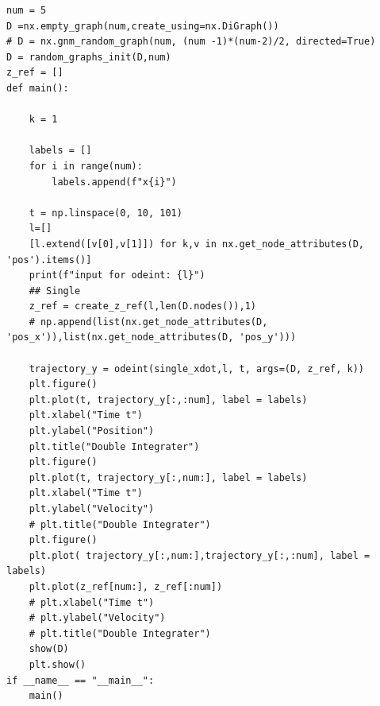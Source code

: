 \documentclass{article}
\begin{document}
\begin{verbatim}
num = 5
D =nx.empty_graph(num,create_using=nx.DiGraph())
# D = nx.gnm_random_graph(num, (num -1)*(num-2)/2, directed=True)
D = random_graphs_init(D,num)
z_ref = []
def main():
    
    k = 1
    
    labels = []
    for i in range(num):
        labels.append(f"x{i}")
    
    t = np.linspace(0, 10, 101)
    l=[]
    [l.extend([v[0],v[1]]) for k,v in nx.get_node_attributes(D, 'pos').items()]
    print(f"input for odeint: {l}")
    ## Single
    z_ref = create_z_ref(l,len(D.nodes()),1)
    # np.append(list(nx.get_node_attributes(D, 'pos_x')),list(nx.get_node_attributes(D, 'pos_y')))
    
    trajectory_y = odeint(single_xdot,l, t, args=(D, z_ref, k))
    plt.figure()
    plt.plot(t, trajectory_y[:,:num], label = labels)
    plt.xlabel("Time t")
    plt.ylabel("Position")
    plt.title("Double Integrater")
    plt.figure()
    plt.plot(t, trajectory_y[:,num:], label = labels)
    plt.xlabel("Time t")
    plt.ylabel("Velocity")
    # plt.title("Double Integrater")
    plt.figure()
    plt.plot( trajectory_y[:,num:],trajectory_y[:,:num], label = labels)
    plt.plot(z_ref[num:], z_ref[:num])
    # plt.xlabel("Time t")
    # plt.ylabel("Velocity")
    # plt.title("Double Integrater")
    show(D)
    plt.show()
if __name__ == "__main__":
    main()
\end{verbatim}
\end{document}
